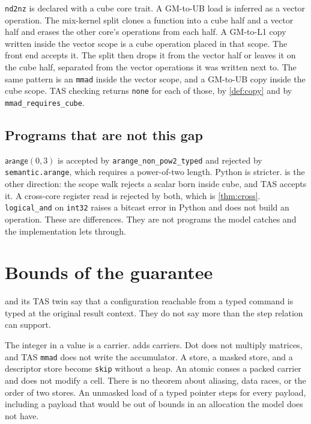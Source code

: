 \documentclass[a4paper,UKenglish,anonymous,cleveref,autoref]{lipics-v2021}
\begin{document}
\texttt{nd2nz} is declared with a cube core trait.
A GM-to-UB load is inferred as a vector operation.
The mix-kernel split clones a function into a cube half and a vector half and erases the other core's operations from each half.
A GM-to-L1 copy written inside the vector scope is a cube operation placed in that scope.
The front end accepts it.
The split then drops it from the vector half or leaves it on the cube half, separated from the vector operations it was written next to.
The same pattern is an \texttt{mmad} inside the vector scope, and a GM-to-UB copy inside the cube scope.
TAS checking returns \texttt{none} for each of those, by \cref{def:copy} and by \texttt{mmad\_requires\_cube}.

\subsection{Programs that are not this gap}

\(\mathsf{arange}(0,3)\) is accepted by \texttt{arange\_non\_pow2\_typed} and rejected by \texttt{semantic.arange}, which requires a power-of-two length.
Python is stricter.
 is the other direction: the scope walk rejects a scalar born inside cube, and TAS accepts it.
A cross-core register read is rejected by both, which is \cref{thm:cross}.
\texttt{logical\_and} on \texttt{int32} raises a bitcast error in Python and does not build an operation.
These are differences.
They are not programs the model catches and the implementation lets through.

\section{Bounds of the guarantee}
\label{sec:bounds}

 and its TAS twin say that a configuration reachable from a typed command is typed at the original result context.
They do not say more than the step relation can support.

The integer in a value is a carrier.
 adds carriers.
Dot does not multiply matrices, and TAS \texttt{mmad} does not write the accumulator.
A store, a masked store, and a descriptor store become \texttt{skip} without a heap.
An atomic conses a packed carrier and does not modify a cell.
There is no theorem about aliasing, data races, or the order of two stores.
An unmasked load of a typed pointer steps for every payload, including a payload that would be out of bounds in an allocation the model does not have.
\end{document}
